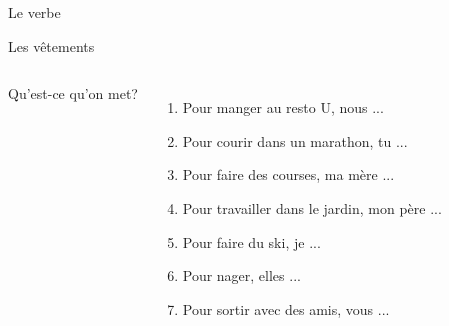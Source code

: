 \documentclass{beamer}
\begin{document}
  \begin{frame}{Le verbe}
    \begin{center}
      
    \end{center}
  \end{frame}

  \begin{frame}{Les vêtements}
    \begin{columns}
        Qu'est-ce qu'on met? \\
        {\small
        \begin{enumerate}
          \item Pour manger au resto U, nous \underline{} ...
          \item Pour courir dans un marathon, tu \underline{} ...
          \item Pour faire des courses, ma mère \underline{} ...
          \item Pour travailler dans le jardin, mon père \underline{} ...
          \item Pour faire du ski, je \underline{} ...
          \item Pour nager, elles \underline{} ...
          \item Pour sortir avec des amis, vous \underline{} ...
        \end{enumerate}
        }
        \begin{minipage}[c][0.6\textheight]{\linewidth}
          \begin{center}
          \end{center}
        \end{minipage}
    \end{columns}
  \end{frame}
\end{document}
